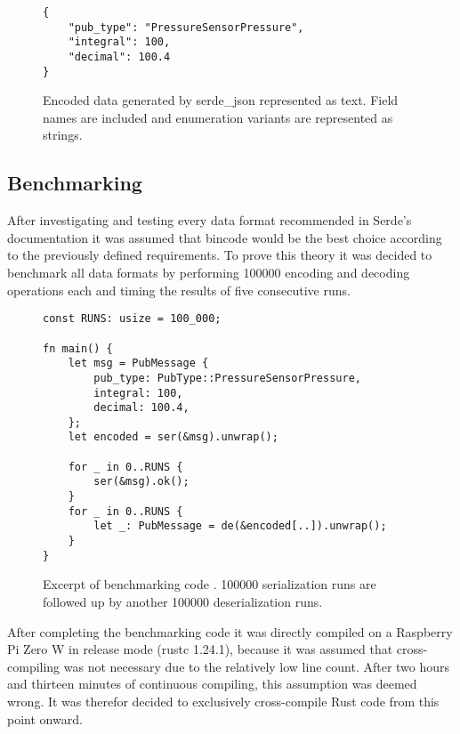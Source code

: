 \begin{figure}[H]
\begin{verbatim}
{
	"pub_type": "PressureSensorPressure",
	"integral": 100,
	"decimal": 100.4
}
\end{verbatim}
\caption{Encoded data generated by serde\_json represented as text. Field names are included and enumeration variants are represented as strings.} 
\end{figure}


\subsection{Benchmarking}
After investigating and testing every data format recommended in Serde's documentation it was assumed that bincode would be the best choice according to the previously defined requirements. To prove this theory it was decided to benchmark all data formats by performing 100000 encoding and decoding operations each and timing the results of five consecutive runs. 

\begin{figure}[H]
\begin{verbatim}
const RUNS: usize = 100_000;

fn main() {
    let msg = PubMessage {
        pub_type: PubType::PressureSensorPressure,
        integral: 100,
        decimal: 100.4,
    };
    let encoded = ser(&msg).unwrap();

    for _ in 0..RUNS {
        ser(&msg).ok();
    }
    for _ in 0..RUNS {
        let _: PubMessage = de(&encoded[..]).unwrap();
    }
}
\end{verbatim}
\caption{Excerpt of benchmarking code \cite{serde-perf}. 100000 serialization runs are followed up by another 100000 deserialization runs.} 
\end{figure}

After completing the benchmarking code it was directly compiled on a Raspberry Pi Zero W in release mode (rustc 1.24.1), because it was assumed that cross-compiling was not necessary due to the relatively low line count. After two hours and thirteen minutes of continuous compiling, this assumption was deemed wrong. It was therefor decided to exclusively cross-compile Rust code from this point onward.

